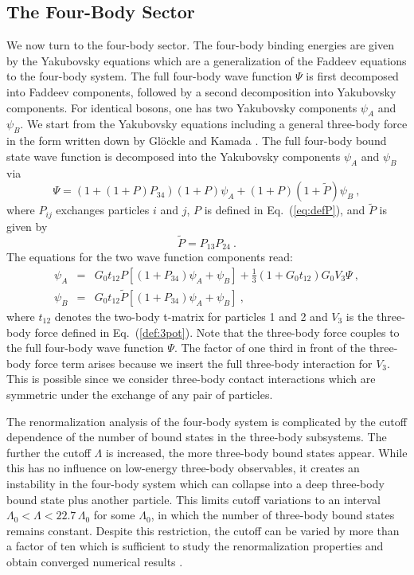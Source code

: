 \documentclass[prc,preprint,showpacs,tightenlines,%
nofootinbib]{revtex4}
\newcommand{\beq}{\begin{equation}}
\newcommand{\eeq}{\end{equation}}
\newcommand{\bea}{\begin{eqnarray}}
\newcommand{\eea}{\end{eqnarray}}
\begin{document}
\subsection{The Four-Body Sector}
\label{sec:effT:4body}
% 
We now turn to the four-body sector. The four-body binding energies
are given by the Yakubovsky equations 
which are a generalization of the Faddeev equations 
to the four-body system. The full four-body wave function $\Psi$ is 
first decomposed into Faddeev components, followed by a second decomposition 
into Yakubovsky components. For identical 
bosons, one has two Yakubovsky components $\psi_A$ and
$\psi_B$. We start from the Yakubovsky equations
including a general three-body force in the form written down by
Gl\"ockle and Kamada \cite{Glockle:1993vr}. The full four-body 
bound state wave function is decomposed into the Yakubovsky
components $\psi_A$ and $\psi_B$ via
\beq
\label{eq:yak_wavefunction}
\Psi=(1+(1+P) P_{34})(1+P)\psi_A +(1+P)(1+\tilde{P})\psi_B~,
\eeq
where $P_{ij}$ exchanges particles $i$ and $j$, $P$ is defined in 
Eq.~(\ref{eq:defP}), and $\tilde{P}$ is given by
\beq
\tilde{P}=P_{13}P_{24}~.
\eeq
The equations for the two wave function components read:
\bea
\psi_A &=& G_0 t_{12} P [ (1+P_{34})\psi_A+\psi_B]
+\frac{1}{3}(1+G_0 t_{12})G_0 V_{3} \Psi~, \nonumber \\
\psi_B &=& G_0 t_{12} \tilde{P} [ (1+P_{34})\psi_A+\psi_B]~,
\label{eq:yaku}
\eea
where $t_{12}$ denotes the two-body t-matrix for particles 1 and 2
and $V_3$ is the three-body force defined in Eq.~(\ref{def:3pot}).
Note that the three-body force couples to the 
full four-body wave function $\Psi$. The factor of one third in front 
of the three-body force term arises because we insert the full 
three-body interaction for $V_3$. This is possible
since we consider three-body contact interactions which are symmetric 
under the exchange of any pair of particles.

The renormalization analysis of the four-body system is complicated 
by the cutoff dependence of the number of  bound states in the three-body 
subsystems. The further the cutoff $\Lambda$ is increased, the more
three-body bound states appear. While this has no influence on low-energy 
three-body observables, it creates an instability in the four-body system
which can collapse into a deep three-body bound state plus another particle.
This limits cutoff variations to an interval $\Lambda_0 < \Lambda < 
22.7 \,\Lambda_0$ for some $\Lambda_0$, in which the number of three-body 
bound states remains constant. Despite this restriction, the cutoff can
be varied by more than a factor of ten which is
sufficient to study the renormalization properties and 
obtain converged numerical results \cite{Platter04}. 
\end{document}
